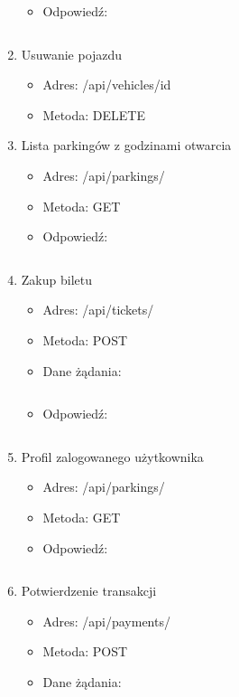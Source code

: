 \begin{enumerate}
\begin{itemize}
		\inputminted[fontsize=\footnotesize]{json}{src/api/vehicles_post.json}
		\item Odpowiedź:
		\inputminted[fontsize=\footnotesize]{json}{src/api/vehicle-created.json}
	\end{itemize}
	\item Usuwanie pojazdu
	\renewcommand{\labelitemi}{\textperiodcentered}
	\begin{itemize}
		\item Adres: /api/vehicles/{{id}}
		\item Metoda: DELETE
	\end{itemize}
	\item Lista parkingów z godzinami otwarcia
	\renewcommand{\labelitemi}{\textperiodcentered}
	\begin{itemize}
		\item Adres: /api/parkings/
		\item Metoda: GET
		\item Odpowiedź:
		\inputminted[fontsize=\footnotesize]{json}{src/api/parkings-response.json}
	\end{itemize}
	\item Zakup biletu
	\renewcommand{\labelitemi}{\textperiodcentered}
	\begin{itemize}
		\item Adres: /api/tickets/
		\item Metoda: POST
		\item Dane żądania:
		\inputminted[fontsize=\footnotesize]{json}{src/api/ticket-post.json}
		\item Odpowiedź:
		\inputminted[fontsize=\footnotesize]{json}{src/api/ticket-response.json}
	\end{itemize}
	\item Profil zalogowanego użytkownika
	\renewcommand{\labelitemi}{\textperiodcentered}
	\begin{itemize}
		\item Adres: /api/parkings/
		\item Metoda: GET
		\item Odpowiedź:
		\inputminted[fontsize=\footnotesize]{json}{src/api/current-response.json}
	\end{itemize}
	\item Potwierdzenie transakcji
	\renewcommand{\labelitemi}{\textperiodcentered}
	\begin{itemize}
		\item Adres: /api/payments/
		\item Metoda: POST
		\item Dane żądania:
		\inputminted[fontsize=\footnotesize]{json}{src/api/payments-post.json}
	\end{itemize}
\end{enumerate}


